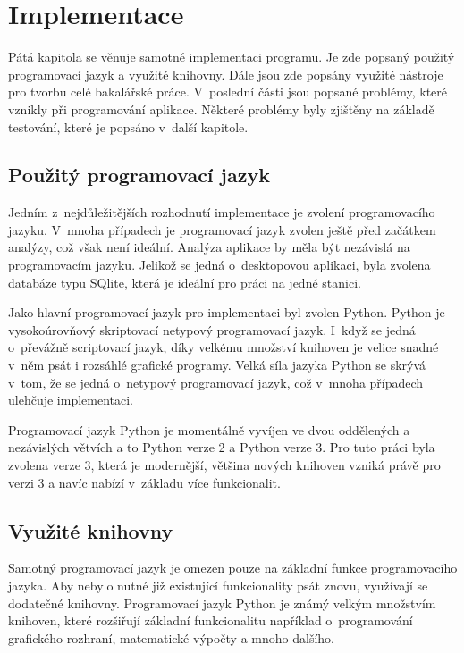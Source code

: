 \documentclass[thesis=B,czech]{resources/FITthesis}[2012/06/26]
\begin{document}
\chapter{Implementace}
Pátá kapitola se věnuje samotné implementaci programu. Je zde popsaný použitý programovací jazyk a využité knihovny.  Dále jsou zde popsány využité nástroje pro tvorbu celé bakalářské práce. V~poslední části jsou popsané problémy, které vznikly při programování aplikace. Některé problémy byly zjištěny na základě testování, které je popsáno v~další kapitole.

\section{Použitý programovací jazyk}
\label{programovaci_jazyk}
Jedním z~nejdůležitějších rozhodnutí implementace je zvolení programovacího jazyku. V~mnoha případech je programovací jazyk zvolen ještě před začátkem analýzy, což však není ideální. Analýza aplikace by měla být nezávislá na programovacím jazyku. Jelikož se jedná o~desktopovou aplikaci, byla zvolena databáze typu SQlite, která je ideální pro práci na jedné stanici. \par

Jako hlavní programovací jazyk pro implementaci byl zvolen Python\cite{python3}. Python je vysokoúrovňový skriptovací netypový programovací jazyk. I~když se jedná o~převážně scriptovací jazyk, díky velkému množství knihoven je velice snadné v~něm psát i rozsáhlé grafické programy. Velká síla jazyka Python se skrývá v~tom, že se jedná o~netypový programovací jazyk, což v~mnoha případech ulehčuje implementaci. \par

Programovací jazyk Python je momentálně vyvíjen ve dvou oddělených a nezávislých větvích a to Python verze 2 a Python verze 3. Pro tuto práci byla zvolena verze 3, která je modernější, většina nových knihoven vzniká právě pro verzi 3 a navíc nabízí v~základu více funkcionalit.

\section{Využité knihovny}
Samotný programovací jazyk je omezen pouze na základní funkce programovacího jazyka. Aby nebylo nutné již existující funkcionality psát znovu, využívají se dodatečné knihovny. Programovací jazyk Python je známý velkým množstvím knihoven, které rozšiřují základní funkcionalitu například o~programování grafického rozhraní, matematické výpočty a mnoho dalšího. 
\end{document}
